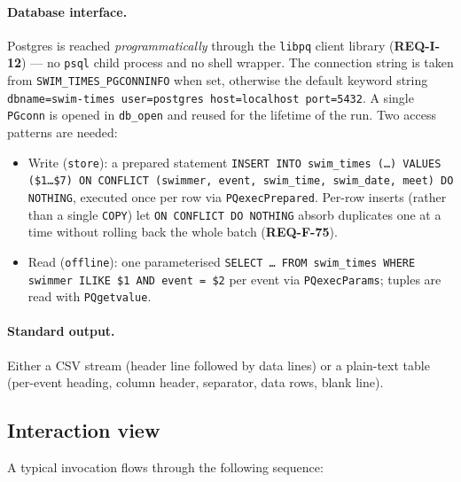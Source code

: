 \documentclass[12pt]{article}
\newcommand{\code}[1]{\texttt{#1}}
\newcommand{\req}[1]{\textbf{#1}}
\begin{document}
\paragraph{Database interface.}
Postgres is reached \emph{programmatically} through the
\texttt{libpq} client library (\req{REQ-I-12}) --- no
\texttt{psql} child process and no shell wrapper.  The
connection string is taken from
\texttt{SWIM\_TIMES\_PGCONNINFO} when set, otherwise the
default keyword string
\texttt{dbname=swim-times user=postgres host=localhost port=5432}.
A single \code{PGconn} is opened in \code{db\_open} and reused
for the lifetime of the run.  Two access patterns are needed:
\begin{itemize}
  \item Write (\code{store}): a prepared statement
        \texttt{INSERT INTO swim\_times (\dots) VALUES
        (\$1\dots\$7) ON CONFLICT (swimmer, event, swim\_time,
        swim\_date, meet) DO NOTHING}, executed once per row via
        \code{PQexecPrepared}.  Per-row inserts (rather than a
        single \texttt{COPY}) let \texttt{ON~CONFLICT~DO~NOTHING}
        absorb duplicates one at a time without rolling back the
        whole batch (\req{REQ-F-75}).
  \item Read (\code{offline}): one parameterised
        \texttt{SELECT \dots\ FROM swim\_times WHERE swimmer
        ILIKE \$1 AND event = \$2} per event via
        \code{PQexecParams}; tuples are read with
        \code{PQgetvalue}.
\end{itemize}

\paragraph{Standard output.}
Either a CSV stream (header line followed by data lines) or a
plain-text table (per-event heading, column header, separator,
data rows, blank line).

\subsection{Interaction view}

A typical invocation flows through the following sequence:
\end{document}
